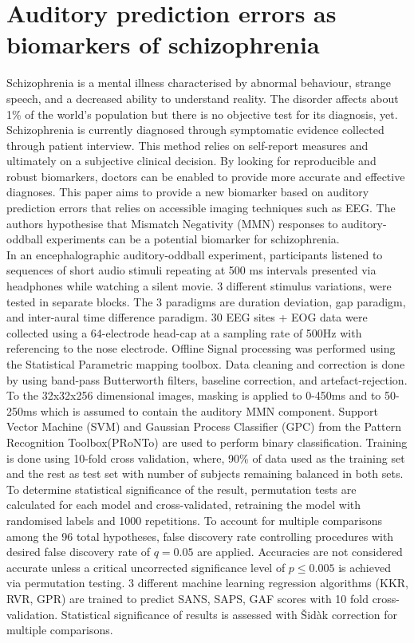 \documentclass[10pt]{article}
\begin{document}
  \section*{Auditory prediction errors as biomarkers of schizophrenia}
  
  Schizophrenia is a mental illness characterised by abnormal behaviour, strange speech, and a decreased ability to understand reality. The disorder affects about 1\% of the world's population but there is no objective test for its diagnosis, yet. Schizophrenia is currently diagnosed through symptomatic evidence collected through patient interview. This method relies on self-report measures and ultimately on a subjective clinical decision. By looking for reproducible and robust biomarkers, doctors can be enabled to provide more accurate and effective diagnoses.
  This paper aims to provide a new biomarker based on auditory prediction errors that relies on accessible imaging techniques such as EEG.
  The authors hypothesise that Mismatch Negativity (MMN) responses to auditory-oddball experiments can be a potential biomarker for schizophrenia.\\

  In an encephalographic auditory-oddball experiment, participants listened to sequences of short audio stimuli repeating at 500 ms intervals presented via headphones while watching a silent movie.
  3 different stimulus variations, were tested in separate blocks. 
  The 3 paradigms are duration deviation, gap paradigm, and inter-aural time difference paradigm.
  30 EEG sites + EOG data were collected using a 64-electrode head-cap at a sampling rate of 500Hz with referencing to the nose electrode. Offline Signal processing was performed using the Statistical Parametric mapping toolbox.
  Data cleaning and correction is done by using band-pass Butterworth filters, baseline correction, and artefact-rejection. To the 32x32x256 dimensional images, masking is applied to 0-450ms and to 50-250ms which is assumed to contain the auditory MMN component.
  Support Vector Machine (SVM) and Gaussian Process Classifier (GPC) from the Pattern Recognition Toolbox(PRoNTo) are used to perform binary classification. Training is done using 10-fold cross validation, where, 90\% of data used as the training set and the rest as test set with number of subjects remaining balanced in both sets.
  To determine statistical significance of the result, permutation tests are calculated for each model and cross-validated, retraining the model with randomised labels and 1000 repetitions.
  To account for multiple comparisons among the 96 total hypotheses, false discovery rate controlling procedures with desired false discovery rate of $q=0.05$ are applied. 
  Accuracies are not considered accurate unless a critical uncorrected significance level of $p \le 0.005$ is achieved via permutation testing. 3 different machine learning regression algorithms (KKR, RVR, GPR) are trained to predict SANS, SAPS, GAF scores with 10 fold cross-validation. Statistical significance of results is assessed with \v{S}id\`{a}k correction for multiple comparisons.
\end{document}
